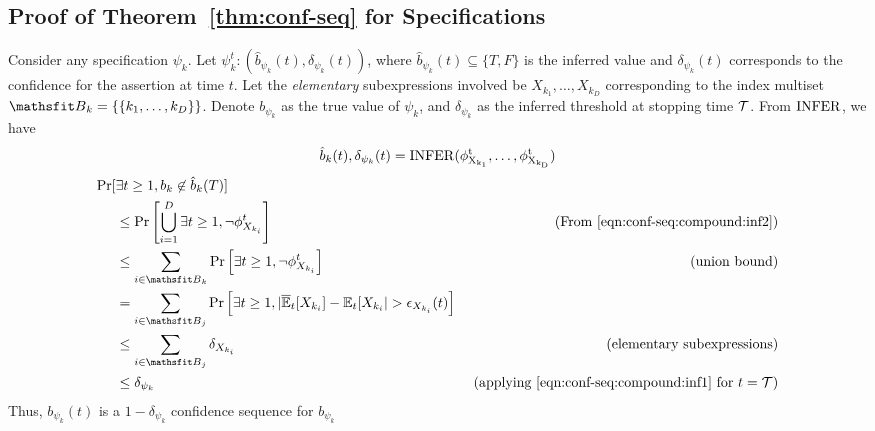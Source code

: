 \begin{subappendices}
\subsection{Proof of Theorem~\ref{thm:conf-seq} for Specifications}
\label{sec:thm:conf-seq:proof:contd}


Consider any specification $\psi_k$. Let $\psi_k^t : (\hat{b}_{\psi_k}(t), \delta_{\psi_k}(t))$,
where $\hat{b}_{\psi_k}(t) \subseteq \{T, F\}$ is the inferred value and $\delta_{\psi_k}(t)$ corresponds to the confidence for the assertion at time $t$. 
Let the \textit{elementary} subexpressions involved be $X_{k_1}, \dots, X_{k_D}$ corresponding to the index multiset $\etB_k = \{\{k_1, \dots, k_D \}\}$.
Denote $b_{\psi_k}$ as the true value of $\psi_k$, and $\delta_{\psi_k}$ as the inferred threshold at stopping time ${\mathcal{T}}$.
From $\rm{INFER}$, we have
\begin{equation}
\hat{b}_k(t), \delta_{\psi_k}(t) = \rm{INFER}(\phi^t_{X_{k_1}}, \dots, \phi^t_{X_{k_D}})
\label{eqn:conf-seq:compound:inf2}
\end{equation}
\begin{align*}
     \Pr[&\exists t \geq 1, b_k \not\in \hat{b}_k(T)]\\
        &\leq \Pr\left[\bigcup\limits_{i = 1}^{D} \exists t \geq 1,  \neg \phi_{X_{k_i}}^t \right]  & \text{ (From \ref{eqn:conf-seq:compound:inf2})} \\
      &\leq \sum\limits_{i\in \etB_k}\Pr\left[\exists t \geq 1, \neg \phi^t_{X_{k_i}}\right]  & \text{ (union bound)} \\
      &= \sum\limits_{i\in \etB_j}\Pr\left[\exists t \geq 1, |\BarE_t[X_{k_i}] - \E_t[X_{k_i}| > \epsilon_{X_{k_i}}(t)\right]  \\
      &\leq \sum\limits_{i\in \etB_j} \delta_{X_{k_i}} & \text{(elementary subexpressions)} \\
      &\leq \delta_{\psi_k}  & \text{ (applying \ref{eqn:conf-seq:compound:inf1} for $t = \gT$)}
\end{align*}
Thus, $b_{\psi_k}(t)$ is a $1-\delta_{\psi_k}$ confidence sequence for $b_{\psi_k}$




\end{subappendices}
